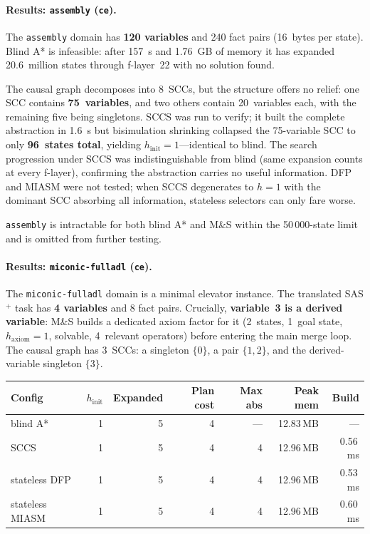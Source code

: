 \documentclass[11pt,a4paper]{article}
\begin{document}
\paragraph{Results: \texttt{assembly} (\texttt{ce}).}

The \texttt{assembly} domain has \textbf{120 variables} and 240 fact pairs
(16~bytes per state).
Blind A* is infeasible: after 157~s and 1.76~GB of memory it has expanded
20.6~million states through f-layer~22 with no solution found.

The causal graph decomposes into 8~SCCs, but the structure offers no relief:
one SCC contains \textbf{75~variables}, and two others contain 20~variables
each, with the remaining five being singletons.
SCCS was run to verify; it built the complete abstraction in 1.6~s
but bisimulation shrinking collapsed the 75-variable SCC to only
\textbf{96~states total}, yielding $h_{\mathrm{init}} = 1$---identical to
blind.
The search progression under SCCS was indistinguishable from blind (same
expansion counts at every f-layer), confirming the abstraction carries no
useful information.
DFP and MIASM were not tested; when SCCS degenerates to $h = 1$ with the
dominant SCC absorbing all information, stateless selectors can only fare
worse.

\texttt{assembly} is intractable for both blind A* and M\&S within the
50\,000-state limit and is omitted from further testing.

\paragraph{Results: \texttt{miconic-fulladl} (\texttt{ce}).}

The \texttt{miconic-fulladl} domain is a minimal elevator instance.
The translated SAS$^+$ task has \textbf{4 variables} and 8 fact pairs.
Crucially, \textbf{variable~3 is a derived variable}: M\&S builds a dedicated
axiom factor for it (2~states, 1~goal state, $h_{\mathrm{axiom}} = 1$,
solvable, 4~relevant operators) before entering the main merge loop.
The causal graph has 3~SCCs: a singleton $\{0\}$, a pair $\{1,2\}$, and the
derived-variable singleton $\{3\}$.

\begin{center}
\small
\begin{tabular}{lrrrrrr}
\toprule
\textbf{Config} & \textbf{$h_{\mathrm{init}}$} & \textbf{Expanded}
  & \textbf{Plan cost} & \textbf{Max abs} & \textbf{Peak mem} & \textbf{Build} \\
\midrule
blind A*            & 1 & 5 & 4 & --- & 12.83\,MB & ---      \\
SCCS                & 1 & 5 & 4 & 4   & 12.96\,MB & 0.56\,ms \\
stateless DFP       & 1 & 5 & 4 & 4   & 12.96\,MB & 0.53\,ms \\
stateless MIASM     & 1 & 5 & 4 & 4   & 12.96\,MB & 0.60\,ms \\
\bottomrule
\end{tabular}
\end{center}
\end{document}
